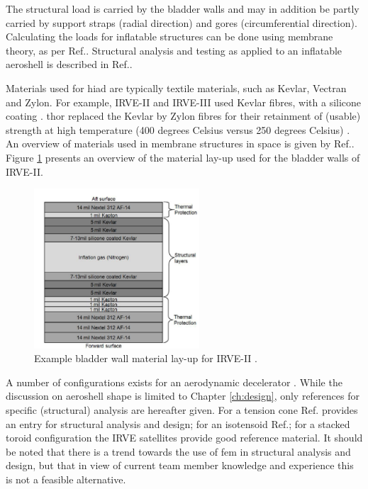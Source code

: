 The structural load is carried by the bladder walls and may in addition be partly carried by support straps (radial direction) and gores (circumferential direction). Calculating the loads for inflatable structures can be done using membrane theory, as per Ref.\cite{Young2002}. Structural analysis and testing as applied to an inflatable aeroshell is described in Ref.\cite{Lindell2006}.

Materials used for \gls{hiad} are typically textile materials, such as Kevlar, Vectran and Zylon. For example, IRVE-II and IRVE-III used Kevlar fibres, with a silicone coating \cite{Dillman2012a}. \gls{thor} replaced the Kevlar by Zylon fibres for their retainment of (usable) strength at high temperature (400 degrees Celsius versus 250 degrees Celsius) \cite{Dillman2014}. An overview of materials used in membrane structures in space is given by Ref.\cite{Jenkins2001}. Figure \ref{fig:matlayup} presents an overview of the material lay-up used for the bladder walls of IRVE-II.

\begin{figure}[H]
\centering
\includegraphics[width = 0.55\textwidth]{Figure/IRVE2_bladder_mat.PNG}
\caption[Example bladder wall material lay-up for IRVE-II]{Example bladder wall material lay-up for IRVE-II \cite[p.2]{Dillman2010}.}
\label{fig:matlayup}
\end{figure}

A number of configurations exists for an aerodynamic decelerator \cite{Smith2010}. While the discussion on aeroshell shape is limited to Chapter \ref{ch:design}, only references for specific (structural) analysis are hereafter given. For a tension cone Ref.\cite{Yamada2009} provides an entry for structural analysis and design; for an isotensoid Ref.\cite{Smith2011}; for a stacked toroid configuration the IRVE satellites provide good reference material. It should be noted that there is a trend towards the use of \gls{fem} in structural analysis and design, but that in view of current team member knowledge and experience this is not a feasible alternative.

